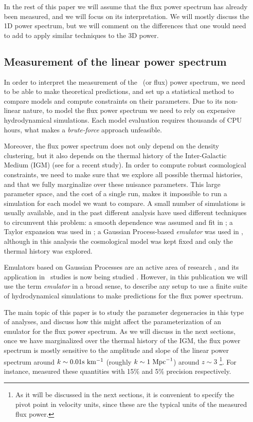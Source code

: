In the rest of this paper we will assume that the flux power spectrum
has already been measured, and we will focus on its interpretation.
We will mostly discuss the 1D power spectrum, but we will comment on the
differences that one would need to add to apply similar techniques to the
3D power.


\subsection{Measurement of the linear power spectrum}

In order to interpret the measurement of the \lya\ (or flux) power spectrum,
we need to be able to make theoretical predictions, and set up a statistical
method to compare models and compute constraints on their parameters.
Due to its non-linear nature, to model the flux power
spectrum we need to rely on expensive hydrodynamical simulations.
Each model evaluation requires thousands of CPU hours, what makes a
\textit{brute-force} approach unfeasible.

Moreover, the flux power spectrum does not only depend on the density
clustering, but it also depends on the thermal history of the
Inter-Galactic Medium (IGM) (see \cite{Walther2018b} for a recent study).
In order to compute robust cosmological constraints, we need to make sure
that we explore all possible thermal histories, and that we fully marginalize
over these nuisance parameters.
This large parameter space, and the cost of a single run, makes it impossible
to run a simulation for each model we want to compare.
A small number of simulations is usually available, and in the past different
analysis have used different techniques to circumvent this problem:
a smooth dependence was assumed and fit in \cite{McDonald2005a};
a Taylor expansion was used in \cite{Palanque-Delabrouille2013};
a Gaussian Process-based \textit{emulator} was used in
\cite{Walther2018a,Walther2018b}, although in this analysis the cosmological
model was kept fixed and only the thermal history was explored.

Emulators based on Gaussian Processes are an active area of research
\cite{Heitmann2009,Heitmann2014,SLAC2018}, and its application in \lya\
studies is now being studied \cite{Walther2018a,Bird2018,Rogers2018c}.
However, in this publication we will use the term \textit{emulator} in a broad
sense, to describe any setup to use a finite suite of hydrodynamical
simulations to make predictions for the flux power spectrum.

The main topic of this paper is to study the parameter degeneracies in this
type of analyses, and discuss how this might affect the parameterization of
an emulator for the flux power spectrum.
As we will discuss in the next sections, once we have marginalized over
the thermal history of the IGM, the flux power spectrum is mostly
sensitive to the amplitude and slope of the linear power spectrum around
$k \sim 0.01 {\rm s~km^{-1}}$ (roughly $k \sim 1 \ \text{Mpc}^{-1}$) around $z \sim 3$
\footnote{As it will be discussed in the next sections, it is convenient
to specify the pivot point in velocity units, since these are the typical
units of the measured flux power.}.
For instance, \cite{McDonald2005a} measured these quantities with 15\% and
5\% precision respectively.

